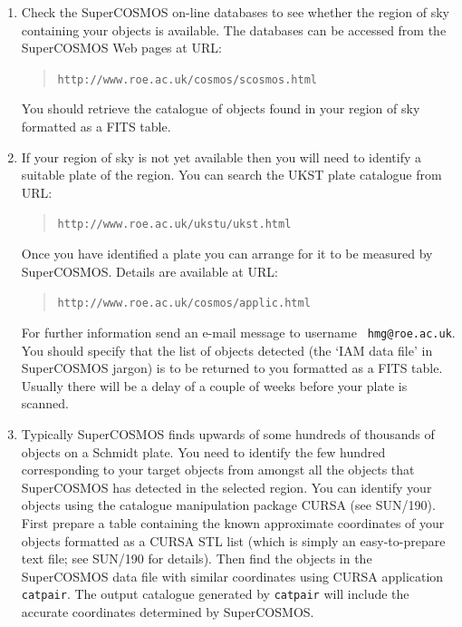 \documentclass[twoside,11pt]{article}
\newcommand{\htmladdnormallink}[2]{#1}
\newcommand{\xref}[3]{#1}
\begin{document}
\begin{enumerate}

  \item Check the SuperCOSMOS on-line databases to see whether the
   region of sky containing your objects is available.  The databases
   can be accessed from the SuperCOSMOS Web pages at URL:

  \begin{quote}
  \htmladdnormallink{ {\tt http://www.roe.ac.uk/cosmos/scosmos.html}}
   {http://www.roe.ac.uk/cosmos/scosmos.html}
  \end{quote}

   You should retrieve the catalogue of objects found in your region
   of sky formatted as a FITS table.

  \item If your region of sky is not yet available then you will need to
   identify a suitable plate of the region.  You can search the UKST plate
   catalogue from URL:

  \begin{quote}
  \htmladdnormallink{ {\tt http://www.roe.ac.uk/ukstu/ukst.html}}
   {http://www.roe.ac.uk/ukstu/ukst.html}
  \end{quote}

   Once you have identified a plate you can arrange for it to be measured
   by SuperCOSMOS.  Details are available at URL:

  \begin{quote}
  \htmladdnormallink{ {\tt http://www.roe.ac.uk/cosmos/applic.html}}
   {http://www.roe.ac.uk/cosmos/applic.html}
  \end{quote}

   For further information send an e-mail message to username {\tt
   hmg@roe.ac.uk}.  You should specify that the list of objects
   detected (the `IAM data file' in SuperCOSMOS jargon) is to be
   returned to you formatted as a FITS table.  Usually there will be
   a delay of a couple of weeks before your plate is scanned.

  \item Typically SuperCOSMOS finds upwards of some hundreds of thousands
   of objects on a Schmidt plate.  You need to identify the few hundred
   corresponding to your target objects from amongst all the objects that
   SuperCOSMOS has detected in the selected region.  You can identify your
   objects using the catalogue manipulation package CURSA (see
   \xref{SUN/190}{sun190}{}\cite{SUN190}).  First prepare a table
   containing the known approximate coordinates of your objects
   formatted as a CURSA STL list (which is simply an easy-to-prepare
   text file; see SUN/190 for details).  Then find the objects in the
   SuperCOSMOS data file with similar coordinates using CURSA application
   {\tt catpair}.  The output catalogue generated by {\tt catpair} will
   include the accurate coordinates determined by SuperCOSMOS.

\end{enumerate}
\end{document}
